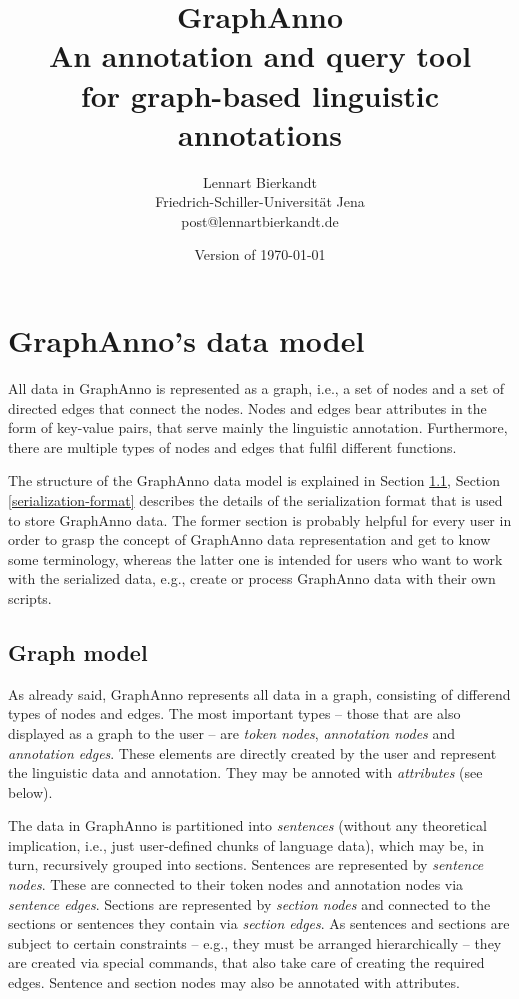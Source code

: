 \documentclass[12pt]{scrartcl}
\title{\LARGE GraphAnno\\ \large An annotation and query tool\\for graph-based linguistic annotations}
\author{Lennart Bierkandt\\\large Friedrich-Schiller-Universität Jena\\[-.2em]\large post@lennartbierkandt.de}
\date{Version of \today}
\begin{document}
\maketitle

\renewcommand{\baselinestretch}{1.05}\normalsize

\tableofcontents



\section{GraphAnno’s data model}

All data in GraphAnno is represented as a graph, i.e., a set of nodes and a set of directed edges that connect the nodes.
Nodes and edges bear attributes in the form of key-value pairs, that serve mainly the linguistic annotation.
Furthermore, there are multiple types of nodes and edges that fulfil different functions.

The structure of the GraphAnno data model is explained in Section \ref{graph-model}, Section \ref{serialization-format} describes the details of the serialization format that is used to store GraphAnno data.
The former section is probably helpful for every user in order to grasp the concept of GraphAnno data representation and get to know some terminology, whereas the latter one is intended for users who want to work with the serialized data, e.g., create or process GraphAnno data with their own scripts.


\subsection{Graph model}\label{graph-model}

As already said, GraphAnno represents all data in a graph, consisting of differend types of nodes and edges.
The most important types – those that are also displayed as a graph to the user – are \textit{token nodes}, \textit{annotation nodes} and \textit{annotation edges}.
These elements are directly created by the user and represent the linguistic data and annotation.
They may be annoted with \textit{attributes} (see below).

The data in GraphAnno is partitioned into \textit{sentences} (without any theoretical implication, i.e., just user-defined chunks of language data), which may be, in turn, recursively grouped into sections.
Sentences are represented by \textit{sentence nodes}.
These are connected to their token nodes and annotation nodes via \textit{sentence edges}.
Sections are represented by \textit{section nodes} and connected to the sections or sentences they contain via \textit{section edges}.
As sentences and sections are subject to certain constraints – e.g., they must be arranged hierarchically –  they are created via special commands, that also take care of creating the required edges.
Sentence and section nodes may also be annotated with attributes.
\end{document}
